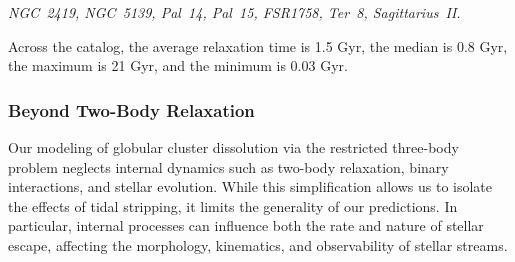             \textit{NGC~2419, NGC~5139, Pal~14, Pal~15, FSR1758, Ter~8, Sagittarius~II.}

            Across the catalog, the average relaxation time is 1.5 Gyr, the median is 0.8 Gyr, the maximum is 21 Gyr, and the minimum is 0.03 Gyr.




    
        
        \subsubsection{Beyond Two-Body Relaxation}
            Our modeling of globular cluster dissolution via the restricted three-body problem neglects internal dynamics such as two-body relaxation, binary interactions, and stellar evolution. While this simplification allows us to isolate the effects of tidal stripping, it limits the generality of our predictions. In particular, internal processes can influence both the rate and nature of stellar escape, affecting the morphology, kinematics, and observability of stellar streams.

